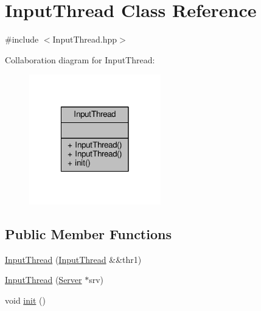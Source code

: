 \hypertarget{class_input_thread}{\section{Input\-Thread Class Reference}
\label{class_input_thread}
}


{\ttfamily \#include $<$Input\-Thread.\-hpp$>$}



Collaboration diagram for Input\-Thread\-:
\nopagebreak
\begin{figure}[H]
\begin{center}
\leavevmode
\includegraphics[width=162pt]{class_input_thread__coll__graph}
\end{center}
\end{figure}
\subsection*{Public Member Functions}
\begin{DoxyCompactItemize}
\item 
\hyperlink{class_input_thread_a79ba754c063684c11485a951fac84e8b}{Input\-Thread} (\hyperlink{class_input_thread}{Input\-Thread} \&\&thr1)
\item 
\hyperlink{class_input_thread_a486139cd9105ce017bcf930dc3e0747b}{Input\-Thread} (\hyperlink{class_server}{Server} $\ast$srv)
\item 
void \hyperlink{class_input_thread_ac33f0f934c6dc40c7747b96e8b60a736}{init} ()
\end{DoxyCompactItemize}


